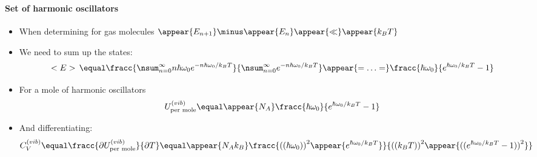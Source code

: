 \begin{frame}
\frametitle{\texorpdfstring{\culine[\sectiontitleulinecolor]{\sectiontitle}}{\sectiontitle} }
\framesubtitle{Set of harmonic oscillators}

\begin{itemize}[itemsep=1.7mm]
	\item When determining  for gas molecules  $\appear{E_{n+1}} \minus \appear{E_n} \appear{\ll} \appear{k_B T}$   
	
	\item We need to sum up the states: %
\[
<E>\,  \equal  \fracc{\nsum_{n=0}^{\infty} n \hbar \omega_{0} e^{-n \hbar \omega_{0} / k_{B} T}}{\nsum_{n=0}^{\infty} e^{-n \hbar \omega_{0} / k_{B} T}} \appear{=\ldots=} \fracc{\hbar \omega_{0}}{e^{\hbar \omega_{0} / k_{B} T}-1}
\]

\item For a mole of harmonic oscillators 
\[
U_{\text {per mole}}^{(vib)}  \equal \appear{N_{A}} \fracc{\hbar \omega_{0}}{e^{\hbar \omega_{0} / k_{B} T}-1}
\]

\item And differentiating:
\[
C_{V}^{(vib)}  \equal \fracc{\partial U_\text{per mole}^{(vib)}}{\partial T}
 \equal \appear{N_{A} k_{B}} \fracc{ \textrm{((} \hbar \omega_{0} \textrm{))}^{2} \appear{e^{\hbar \omega_{0} / k_{B} T}} }{ \textrm{((} k_{B} T \textrm{))} ^{2}\appear{ \textrm{((} e^{\hbar \omega_{0} / k_{B} T}-1 \textrm{))} ^{2}} }
\]
\end{itemize}

\endofslide 
\end{frame}

